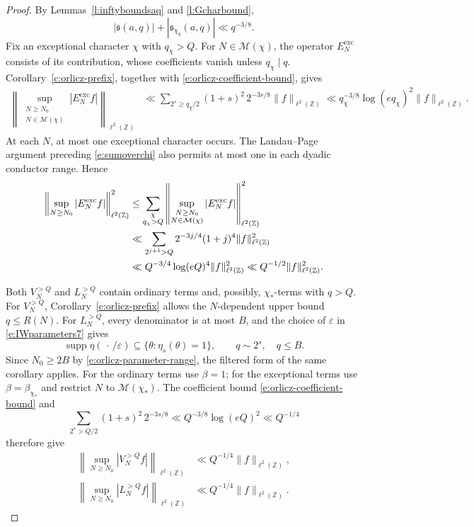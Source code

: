 \documentclass[12pt,reqno]{amsart}
\numberwithin{equation}{section}
\theoremstyle{definition}
\theoremstyle{remark}
\begin{document}
\begin{proof}
By Lemmas~\ref{l:inftyboundsaq} and \ref{l:Gcharbound},
\begin{equation}\label{e:orlicz-coefficient-bound}
 |\mathfrak s(a,q)|+|\mathfrak s_{\chi_q}(a,q)|
 \ll q^{-3/8}.
\end{equation}
Fix an exceptional character \(\chi\) with \(q_\chi>Q\).
For \(N\in\mathcal M(\chi)\), the operator
\(E_N^{\mathrm{exc}}\) consists of its contribution, whose
coefficients vanish unless \(q_\chi\mid q\).
Corollary~\ref{c:orlicz-prefix}, together with
\eqref{e:orlicz-coefficient-bound}, gives
\begin{align*}
 \left\|
 \sup_{\substack{N\geq N_0\\N\in\mathcal M(\chi)}}
 |E_N^{\mathrm{exc}}f|
 \right\|_{\ell^2(\mathbb Z)}
 &\ll
 \sum_{2^s\geq q_\chi/2}
 (1+s)^2\,2^{-3s/8}\|f\|_{\ell^2(\mathbb Z)}\ll
 q_\chi^{-3/8} \log(eq_\chi)^2\|f\|_{\ell^2(\mathbb Z)}.
\end{align*}
At each \(N\), at most one exceptional character occurs.
The Landau--Page argument preceding \eqref{e:sumoverchi} also
permits at most one in each dyadic conductor range. Hence
\begin{align}\label{e:orlicz-large-conductors}
 \left\|
 \sup_{N\geq N_0}|E_N^{\mathrm{exc}}f|
 \right\|_{\ell^2(\mathbb Z)}^2
 &\leq
 \sum_{\substack{\chi\\q_\chi>Q}}
 \left\|
 \sup_{\substack{N\geq N_0\\N\in\mathcal M(\chi)}}
 |E_N^{\mathrm{exc}}f|
 \right\|_{\ell^2(\mathbb Z)}^2
 \notag\\
 &\ll
 \sum_{2^{j+1}>Q}
 2^{-3j/4}(1+j)^4\|f\|_{\ell^2(\mathbb Z)}^2
 \notag\\
 &\ll
 Q^{-3/4}\log(eQ)^4\|f\|_{\ell^2(\mathbb Z)}^2
 \ll Q^{-1/2}\|f\|_{\ell^2(\mathbb Z)}^2.
\end{align}

Both \(V_N^{>Q}\) and \(L_N^{>Q}\) contain ordinary terms and,
possibly, \(\chi_*\)-terms with \(q>Q\).
For \(V_N^{>Q}\), Corollary~\ref{c:orlicz-prefix} allows the
\(N\)-dependent upper bound \(q\leq R(N)\).
For \(L_N^{>Q}\), every denominator is at most \(B\), and the
choice of \(\varepsilon\) in \eqref{e:IWparameters7} gives
\[
 \operatorname{supp}\eta(\,\cdot\,/\varepsilon)
 \subseteq\{\theta:\eta_s(\theta)=1\},
 \qquad q\sim2^s,\quad q\leq B.
\]
Since \(N_0\geq2B\) by \eqref{e:orlicz-parameter-range}, the
filtered form of the same corollary applies.
For the ordinary terms use \(\beta=1\); for the exceptional terms
use \(\beta=\beta_{\chi_*}\) and restrict \(N\) to
\(\mathcal M(\chi_*)\).
The coefficient bound \eqref{e:orlicz-coefficient-bound} and
\[
 \sum_{2^s>Q/2}(1+s)^2\,2^{-3s/8}
 \ll Q^{-3/8}\log(eQ)^2
 \ll Q^{-1/4}
\]
therefore give
\begin{align}
 \left\|
 \sup_{N\geq N_0}|V_N^{>Q}f|
 \right\|_{\ell^2(\mathbb Z)}
 &\ll Q^{-1/4}\|f\|_{\ell^2(\mathbb Z)},
 \label{e:orlicz-large-denominators}\\
 \left\|
 \sup_{N\geq N_0}|L_N^{>Q}f|
 \right\|_{\ell^2(\mathbb Z)}
 &\ll Q^{-1/4}\|f\|_{\ell^2(\mathbb Z)}.
 \label{e:orlicz-extra-frequencies}
\end{align}


\end{proof}
\end{document}

